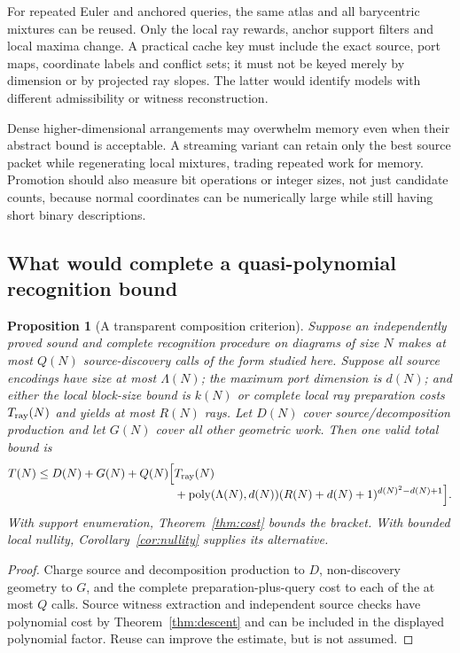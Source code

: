 \documentclass[11pt,a4paper]{article}
\newtheorem{proposition}[theorem]{Proposition}
\theoremstyle{definition}
\theoremstyle{remark}
\begin{document}
For repeated Euler and anchored queries, the same atlas and all barycentric mixtures can be reused. Only the local ray rewards, anchor support filters and local maxima change. A practical cache key must include the exact source, port maps, coordinate labels and conflict sets; it must not be keyed merely by dimension or by projected ray slopes. The latter would identify models with different admissibility or witness reconstruction.

Dense higher-dimensional arrangements may overwhelm memory even when their abstract bound is acceptable. A streaming variant can retain only the best source packet while regenerating local mixtures, trading repeated work for memory. Promotion should also measure bit operations or integer sizes, not just candidate counts, because normal coordinates can be numerically large while still having short binary descriptions.

\subsection{What would complete a quasi-polynomial recognition bound}
\begin{proposition}[A transparent composition criterion]
\label{prop:accounting}
Suppose an independently proved sound and complete recognition procedure on diagrams of size $N$ makes at most $Q(N)$ source-discovery calls of the form studied here. Suppose all source encodings have size at most $\Lambda(N)$; the maximum port dimension is $d(N)$; and either the local block-size bound is $k(N)$ or complete local ray preparation costs $T_{\rm ray}(N)$ and yields at most $R(N)$ rays. Let $D(N)$ cover source/decomposition production and let $G(N)$ cover all other geometric work. Then one valid total bound is
\begin{align}
 T(N)\le D(N)+G(N)+Q(N)\Bigl[&T_{\rm ray}(N)\\[-4pt]
 &+\operatorname{poly}(\Lambda(N),d(N))(R(N)+d(N)+1)^{d(N)^2-d(N)+1}\Bigr].\nonumber
 \label{eq:composition}
\end{align}
With support enumeration, Theorem~\ref{thm:cost} bounds the bracket. With bounded local nullity, Corollary~\ref{cor:nullity} supplies its alternative.
\end{proposition}
\begin{proof}
Charge source and decomposition production to $D$, non-discovery geometry to $G$, and the complete preparation-plus-query cost to each of the at most $Q$ calls. Source witness extraction and independent source checks have polynomial cost by Theorem~\ref{thm:descent} and can be included in the displayed polynomial factor. Reuse can improve the estimate, but is not assumed.
\end{proof}
\end{document}
